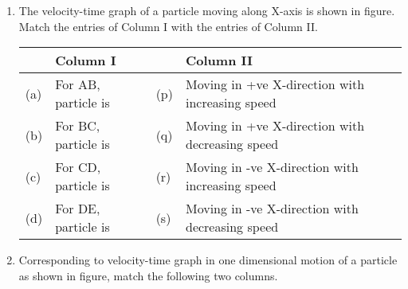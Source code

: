 \documentclass{article}
\begin{document}
\begin{enumerate}
    \item The velocity-time graph of a particle moving along X-axis is shown in figure. Match the entries of Column I with the entries of Column II. 
    
    \begin{center}
    \end{center}

    \begin{center}
        \renewcommand{\arraystretch}{2}
        \begin{table}[h]
            \centering
            \begin{tabular}{p{0.25cm}p{5cm}|p{0.25cm}p{8cm}}
            \hline
            & Column I & & Column II \\
            \hline
            (a) & For AB, particle is & (p) & Moving in +ve X-direction with increasing speed \\
            (b) & For BC, particle is & (q) & Moving in +ve X-direction with decreasing speed \\
            (c) & For CD, particle is & (r) & Moving in -ve X-direction with increasing speed \\
            (d) & For DE, particle is & (s) & Moving in -ve X-direction with decreasing speed \\
            \hline
            \end{tabular}
        \end{table}
    \end{center}
    
    \item Corresponding to velocity-time graph in one dimensional motion of a particle as shown in figure, match the following two columns.
    
    \begin{center}
    \end{center}
    

\end{enumerate}
\end{document}
